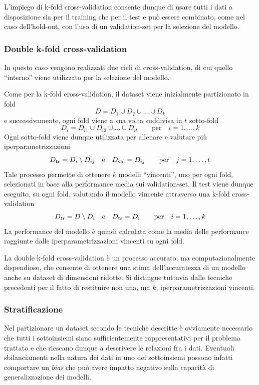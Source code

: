 L'impiego di k-fold cross-validation consente dunque di usare tutti i dati a disposizione sia per il training che per il test e può essere combinato, come nel caso dell'hold-out, con l'uso di un validation-set per la selezione del modello.

\subsubsection*{Double k-fold cross-validation}
In questo caso vengono realizzati due cicli di cross-validation, di cui quello ``interno'' viene utilizzato per la selezione del modello.

Come per la k-fold cross-validation, il dataset viene inizialmente partizionato in fold
\[
D = D_1 \cup D_2 \cup \dots \cup D_k
\]
e successivamente, ogni fold viene a sua volta suddivisa in $t$ sotto-fold
\[
D_i = D_{i1} \cup D_{i2} \cup \dots \cup D_{it}
\qquad \text{per} \quad i=1,\dots,k
\]
Ogni sotto-fold viene dunque utilizzata per allenare e valutare più iperparametrizzazioni
\[
D_\textup{tr} = D_i \setminus D_{ij}
\quad \text{e} \quad 
D_\textup{val} = D_{ij}
\qquad \text{per} \quad j=1,\dots,t
\]
Tale processo permette di ottenere $k$ modelli ``vincenti'', uno per ogni fold, selezionati in base alla performance media sui validation-set. Il test viene dunque eseguito, su ogni fold, valutando il modello vincente attraverso una k-fold cross-validation
\[
D_\textup{tr} = D \setminus D_i
\quad \text{e} \quad 
D_\textup{ts} = D_i
\qquad \text{per} \quad i=1,\dots,k
\]
La performance del modello è quindi calcolata come la media delle performance raggiunte dalle iperparametrizzazioni vincenti su ogni fold.

La double k-fold cross-validation è un processo accurato, ma computazionalmente dispendioso, che consente di ottenere una stima dell'accuratezza di un modello anche su dataset di dimensioni ridotte. Si distingue tuttavia dalle tecniche precedenti per il fatto di restituire non una, ma $k$, iperparametrizzazioni vincenti.

\subsubsection*{Stratificazione}
Nel partizionare un dataset secondo le tecniche descritte è ovviamente necessario che tutti i sottoinsiemi siano sufficientemente rappresentativi per il problema trattato e che riescano dunque a descrivere le relazioni fra i dati. Eventuali sbilanciamenti nella natura dei dati in uno dei sottoinsiemi possono infatti comportare un \emph{bias} che può avere impatto negativo sulla capacità di generalizzazione dei modelli.

